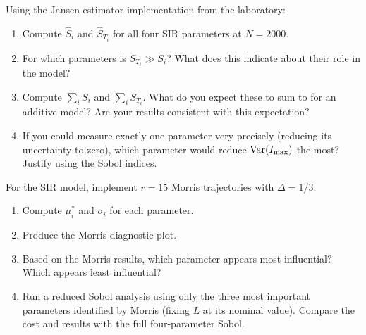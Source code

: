 \begin{exercise}[\bloom{L4}]
\label{ex:ch9:sobolSIR}
Using the Jansen estimator implementation from the laboratory:
\begin{enumerate}[label=(\alph*)]
  \item Compute $\hat{S}_i$ and $\hat{S}_{T_i}$ for all four SIR parameters
        at $N = 2000$.
  \item For which parameters is $S_{T_i} \gg S_i$? What does this indicate
        about their role in the model?
  \item Compute $\sum_i S_i$ and $\sum_i S_{T_i}$. What do you expect
        these to sum to for an additive model? Are your results consistent
        with this expectation?
  \item If you could measure exactly one parameter very precisely
        (reducing its uncertainty to zero), which parameter would reduce
        $\operatorname{Var}(I_{\max})$ the most? Justify using the Sobol indices.
\end{enumerate}
\end{exercise}

\begin{exercise}[\bloom{L4}]
\label{ex:ch9:morris}
For the SIR model, implement $r = 15$ Morris trajectories with $\Delta = 1/3$:
\begin{enumerate}[label=(\alph*)]
  \item Compute $\mu_i^*$ and $\sigma_i$ for each parameter.
  \item Produce the Morris diagnostic plot.
  \item Based on the Morris results, which parameter appears most influential?
        Which appears least influential?
  \item Run a reduced Sobol analysis using only the three most important
        parameters identified by Morris (fixing $L$ at its nominal value).
        Compare the cost and results with the full four-parameter Sobol.
\end{enumerate}
\end{exercise}

